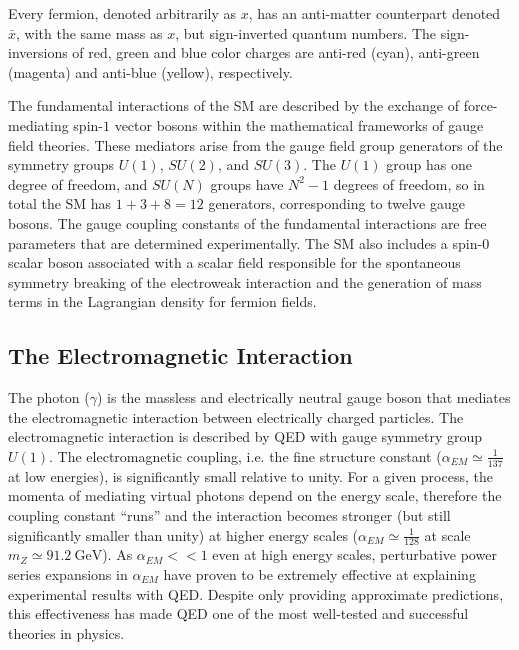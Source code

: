 Every fermion, denoted arbitrarily as $x$, has an anti-matter counterpart denoted $\bar{x}$, with the same mass as $x$, but sign-inverted quantum numbers.
The sign-inversions of red, green and blue color charges are anti-red (cyan), anti-green (magenta) and anti-blue (yellow), respectively.

The fundamental interactions of the SM are described by the exchange of force-mediating spin-$1$ vector bosons within the mathematical frameworks of gauge field theories.
These mediators arise from the gauge field group generators of the symmetry groups $U(1)$, $SU(2)$, and $SU(3)$.
The $U(1)$ group has one degree of freedom, and $SU(N)$ groups have $N^2 - 1$ degrees of freedom, so in total the SM has $1 + 3 + 8 = 12$ generators, corresponding to twelve gauge bosons.
The gauge coupling constants of the fundamental interactions are free parameters that are determined experimentally.
The SM also includes a spin-$0$ scalar boson associated with a scalar field responsible for the spontaneous symmetry breaking of the electroweak interaction and the generation of mass terms in the Lagrangian density for fermion fields.

\subsection{The Electromagnetic Interaction}
The photon ($\gamma$) is the massless and electrically neutral gauge boson that mediates the electromagnetic interaction between electrically charged particles.
The electromagnetic interaction is described by QED with gauge symmetry group $U(1)$.
The electromagnetic coupling, i.e. the fine structure constant ($\alpha_{EM} \simeq \frac{1}{137}$ at low energies), is significantly small relative to unity.
For a given process, the momenta of mediating virtual photons depend on the energy scale, therefore the coupling constant ``runs'' and the interaction becomes stronger (but still significantly smaller than unity) at higher energy scales ($\alpha_{EM} \simeq \frac{1}{128}$ at scale $m_Z \simeq \SI{91.2}{\GeV}$).
As $\alpha_{EM} << 1$ even at high energy scales, perturbative power series expansions in $\alpha_{EM}$ have proven to be extremely effective at explaining experimental results with QED.
Despite only providing approximate predictions, this effectiveness has made QED one of the most well-tested and successful theories in physics.

